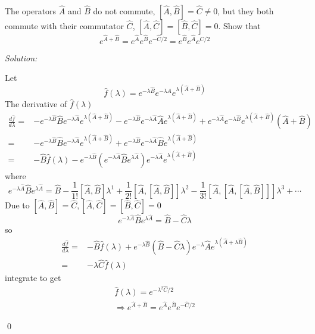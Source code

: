 \documentclass[12pt]{article}
\newenvironment{problem}[2][Problem]{\begin{trivlist}
\item[\hskip \labelsep {\bfseries #1}\hskip \labelsep {\bfseries #2.}]}{\end{trivlist}}
\newenvironment{sol}
    {\emph{Solution:}
    }
    {
    \qed
    }
\begin{document}
\begin{problem}{4}
The operators $\hat{A}$ and $\hat{B}$ do not commute, $[\hat{A},\hat{B}]=\hat{C}\neq0$, but they both commute with their commutator $\hat{C}$, $[\hat{A},\hat{C}]=[\hat{B},\hat{C}]=0$. Show that
\[
e^{\hat{A}+\hat{B}}=e^{\hat{A}}e^{\hat{B}}e^{-\hat{C}/2}=e^{\hat{B}}e^{\hat{A}}e^{\hat{C}/2}
\]
\end{problem}
\begin{sol}
Let
\begin{equation}
\hat{f}(\lambda)=e^{-\lambda\hat{B}}e^{-\lambda{A}}e^{\lambda(\hat{A}+\hat{B})}
\end{equation}
The derivative of $\hat{f}(\lambda)$
\begin{align}
\nonumber\frac{d\hat{f}}{d\lambda}=&-e^{-\lambda\hat{B}}\hat{B}e^{-\lambda\hat{A}}e^{\lambda(\hat{A}+\hat{B})}-e^{-\lambda\hat{B}}e^{-\lambda\hat{A}}\hat{A}e^{\lambda(\hat{A}+\hat{B})}+e^{-\lambda\hat{A}}e^{-\lambda\hat{B}}e^{\lambda(\hat{A}+\hat{B})}(\hat{A}+\hat{B})\\
\nonumber=&-e^{-\lambda\hat{B}}\hat{B}e^{-\lambda\hat{A}}e^{\lambda(\hat{A}+\hat{B})}+e^{-\lambda\hat{B}}e^{-\lambda\hat{A}}\hat{B}e^{\lambda(\hat{A}+\hat{B})}\\
=&-\hat{B}\hat{f}(\lambda)-e^{-\lambda\hat{B}}(e^{-\lambda\hat{A}}\hat{B}e^{\lambda\hat{A}})e^{-\lambda\hat{A}}e^{\lambda(\hat{A}+\hat{B})}
\end{align}
where
\begin{equation}
e^{-\lambda\hat{A}}\hat{B}e^{\lambda\hat{A}}=\hat{B}-\frac{1}{1!}[\hat{A},\hat{B}]\lambda^1+\frac{1}{2!}[\hat{A},[\hat{A},\hat{B}]]\lambda^2-\frac{1}{3!}[\hat{A},[\hat{A},[\hat{A},\hat{B}]]]\lambda^3+\cdots
\end{equation}
Due to $[\hat{A},\hat{B}]=\hat{C},[\hat{A},\hat{C}]=[\hat{B},\hat{C}]=0$
\begin{equation}
e^{-\lambda\hat{A}}\hat{B}e^{\lambda\hat{A}}=\hat{B}-\hat{C}\lambda
\end{equation}
so
\begin{align}
\frac{d\hat{f}}{d\lambda}=&-\hat{B}\hat{f}(\lambda)+e^{-\lambda\hat{B}}(\hat{B}-\hat{C}\lambda)e^{-\lambda}\hat{A}e^{\lambda(\hat{A}+\lambda\hat{B})}\\
=&-\lambda\hat{C}\hat{f}(\lambda)
\end{align}
integrate to get
\begin{gather}
\hat{f}(\lambda)=e^{-\lambda^2\hat{C}/2}\\
\Longrightarrow e^{\hat{A}+\hat{B}}=e^{\hat{A}}e^{\hat{B}}e^{-\hat{C}/2}
\end{gather}

\end{sol}
\end{document}
